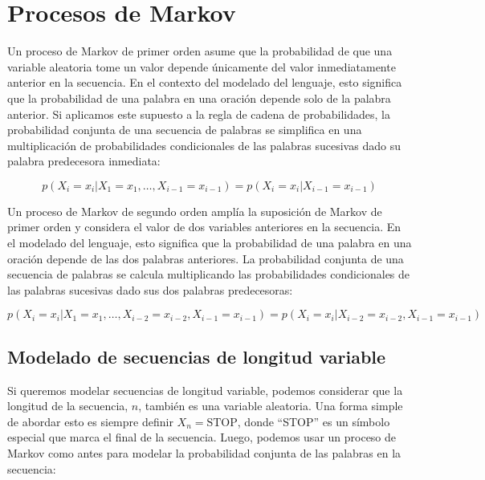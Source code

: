 \section{Procesos de Markov}


Un proceso de Markov de primer orden asume que la probabilidad de que una variable aleatoria tome un valor depende únicamente del valor inmediatamente anterior en la secuencia. En el contexto del modelado del lenguaje, esto significa que la probabilidad de una palabra en una oración depende solo de la palabra anterior. Si aplicamos este supuesto a la regla de cadena de probabilidades, la probabilidad conjunta de una secuencia de palabras se simplifica en una multiplicación de probabilidades condicionales de las palabras sucesivas dado su palabra predecesora inmediata:

\begin{equation}
p(X_i = x_i|X_1 = x_1, \ldots, X_{i-1} = x_{i-1}) = p(X_i = x_i|X_{i-1} = x_{i-1})
\end{equation}




Un proceso de Markov de segundo orden amplía la suposición de Markov de primer orden y considera el valor de dos variables anteriores en la secuencia. En el modelado del lenguaje, esto significa que la probabilidad de una palabra en una oración depende de las dos palabras anteriores. La probabilidad conjunta de una secuencia de palabras se calcula multiplicando las probabilidades condicionales de las palabras sucesivas dado sus dos palabras predecesoras:

\begin{equation}
p(X_i = x_i|X_1 = x_1, \ldots, X_{i-2} = x_{i-2}, X_{i-1} = x_{i-1}) = p(X_i = x_i|X_{i-2} = x_{i-2}, X_{i-1} = x_{i-1})
\end{equation}


\subsection{Modelado de secuencias de longitud variable}

Si queremos modelar secuencias de longitud variable, podemos considerar que la longitud de la secuencia, $n$, también es una variable aleatoria. Una forma simple de abordar esto es siempre definir $X_n = \text{STOP}$, donde ``STOP'' es un símbolo especial que marca el final de la secuencia. Luego, podemos usar un proceso de Markov como antes para modelar la probabilidad conjunta de las palabras en la secuencia:

